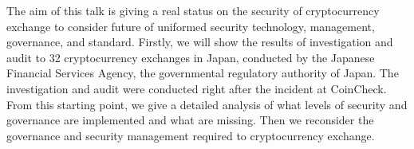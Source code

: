 The aim of this talk is giving a real status on the security of cryptocurrency exchange to consider future of uniformed security technology, management, governance, and standard.
Firstly, we will show the results of investigation and audit to 32 cryptocurrency exchanges in Japan, conducted by the Japanese Financial Services Agency, the governmental regulatory authority of Japan. The investigation and audit were conducted right after the incident at CoinCheck.
From this starting point, we give a detailed analysis of
what levels of security and governance are implemented and what are missing.
Then we reconsider the governance and security management required to cryptocurrency exchange.
